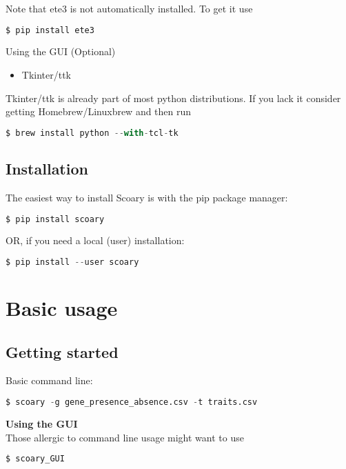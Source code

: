 \documentclass{article}
\begin{document}
    \noindent Note that ete3 is not automatically installed. To get it use 
    \begin{lstlisting}[language=python, basicstyle=\small]
      $ pip install ete3
    \end{lstlisting}

    \noindent Using the GUI (Optional)

    \begin{itemize}

      \item Tkinter/ttk

    \end{itemize}

    \noindent Tkinter/ttk is already part of most python distributions. If you lack it consider getting Homebrew/Linuxbrew and then run
    \begin{lstlisting}[language=python, basicstyle=\small]
      $ brew install python --with-tcl-tk
    \end{lstlisting}

    \subsection{Installation}

    The easiest way to install Scoary is with the pip package manager:
    \begin{lstlisting}[language=python, basicstyle=\small]
      $ pip install scoary
    \end{lstlisting} 
    OR, if you need a local (user) installation:
    \begin{lstlisting}[language=python, basicstyle=\small]
      $ pip install --user scoary
    \end{lstlisting}
  \section{Basic usage}

    \subsection{Getting started}
      Basic command line:
      \begin{lstlisting}[language=python, basicstyle=\small]
        $ scoary -g gene_presence_absence.csv -t traits.csv
      \end{lstlisting}
    
      \noindent \textbf{Using the GUI} \\
      \noindent Those allergic to command line usage might want to use
      \begin{lstlisting}[language=python, basicstyle=\small]
        $ scoary_GUI
      \end{lstlisting}
\end{document}

